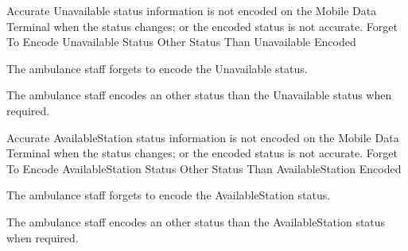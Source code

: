   
    {}

  \startkaosspec
  	 {Accurate Unavailable status information is not encoded on the Mobile Data Terminal when the status changes; or the encoded status is not accurate.}
  	 {Forget To Encode Unavailable Status}
  	 {Other Status Than Unavailable Encoded}
  \stopkaosspec
  
  \startkaosspec
  	 {The ambulance staff forgets to encode the Unavailable status.}
  \stopkaosspec
  
  \startkaosspec
  	 {The ambulance staff encodes an other status than the Unavailable status when required.}
  \stopkaosspec
  
  
    {}

  \startkaosspec
  	 {Accurate AvailableStation status information is not encoded on the Mobile Data Terminal when the status changes; or the encoded status is not accurate.}
  	 {Forget To Encode AvailableStation Status}
  	 {Other Status Than AvailableStation Encoded}
  \stopkaosspec
  
  \startkaosspec
  	 {The ambulance staff forgets to encode the AvailableStation status.}
  \stopkaosspec
  
  \startkaosspec
  	 {The ambulance staff encodes an other status than the AvailableStation status when required.}
  \stopkaosspec
  
  
